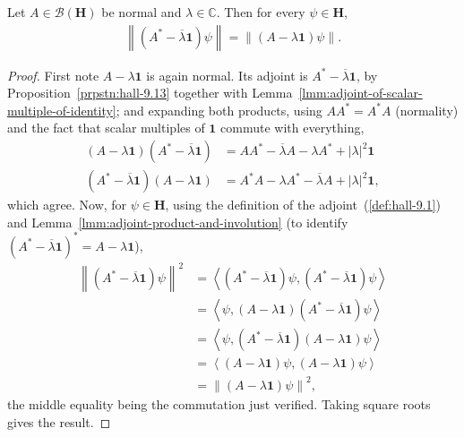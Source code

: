 \begin{lemma}
    \label{lmm:normality-balances-norms}
    \leanok
    Let $A \in \mathcal{B}(\mathbf{H})$ be normal and $\lambda \in \mathbb{C}$. Then for every $\psi \in \mathbf{H}$,
    \begin{align}
        \left\| (A^* - \overline\lambda\mathbf{1})\psi \right\| = \left\| (A - \lambda\mathbf{1})\psi \right\|.
    \end{align}
\end{lemma}
\begin{proof}
    \leanok
First note $A - \lambda\mathbf{1}$ is again normal. Its adjoint is $A^* - \overline{\lambda}\mathbf{1}$, by Proposition~\ref{prpstn:hall-9.13} together with Lemma~\ref{lmm:adjoint-of-scalar-multiple-of-identity}; and expanding both products, using $AA^* = A^*A$ (normality) and the fact that scalar multiples of $\mathbf{1}$ commute with everything,
\begin{align}
    (A - \lambda\mathbf{1})(A^* - \overline\lambda\mathbf{1}) &= AA^* - \overline\lambda A - \lambda A^* + \lvert \lambda \rvert^2 \mathbf{1} \\
    (A^* - \overline\lambda\mathbf{1})(A - \lambda\mathbf{1}) &= A^*A - \lambda A^* - \overline\lambda A + \lvert \lambda \rvert^2 \mathbf{1},
\end{align}
which agree. Now, for $\psi \in \mathbf{H}$, using the definition of the adjoint~(\ref{def:hall-9.1}) and Lemma~\ref{lmm:adjoint-product-and-involution} (to identify $(A^* - \overline\lambda\mathbf{1})^* = A - \lambda\mathbf{1}$),
\begin{align}
    \left\| (A^* - \overline\lambda\mathbf{1})\psi \right\|^2
        &= \left< (A^* - \overline\lambda\mathbf{1})\psi, (A^* - \overline\lambda\mathbf{1})\psi \right> \\
        &= \left< \psi, (A - \lambda\mathbf{1})(A^* - \overline\lambda\mathbf{1})\psi \right> \\
        &= \left< \psi, (A^* - \overline\lambda\mathbf{1})(A - \lambda\mathbf{1})\psi \right> \\
        &= \left< (A - \lambda\mathbf{1})\psi, (A - \lambda\mathbf{1})\psi \right> \\
        &= \left\| (A - \lambda\mathbf{1})\psi \right\|^2,
\end{align}
the middle equality being the commutation just verified. Taking square roots gives the result.
\end{proof}

